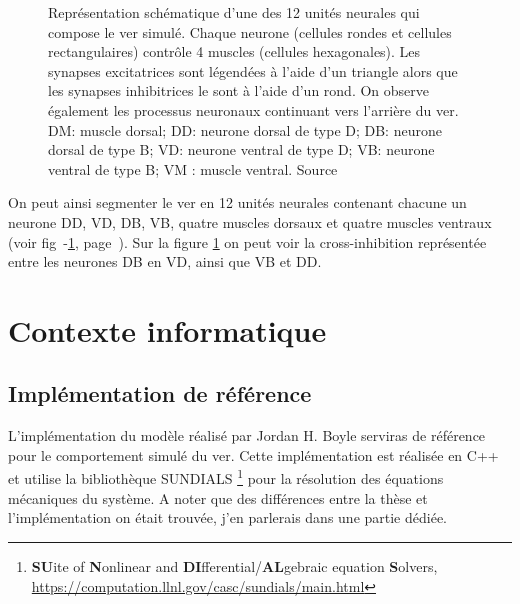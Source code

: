 \begin{figure}[ht]
   \begin{center}
   \end{center}
   \caption[Représentation d'une unité neural de \celeg{}]{Représentation
   schématique d'une des 12 unités neurales qui compose le ver simulé. Chaque
   neurone (cellules rondes et cellules rectangulaires) contrôle 4 muscles
   (cellules hexagonales).  Les synapses excitatrices sont légendées à l'aide
   d'un triangle alors que les synapses inhibitrices le sont à l'aide d'un
   rond.  On observe également les processus neuronaux continuant vers
   l'arrière du ver.  DM: muscle dorsal; DD: neurone dorsal de type D; DB:
   neurone dorsal de type B; VD: neurone ventral de type D; VB: neurone ventral
   de type B; VM : muscle ventral.  Source \cite{Boyle2009}}
   \label{fig:celegans_segment}
\end{figure}

On peut ainsi segmenter le ver en 12 unités neurales contenant chacune un neurone DD, VD,
DB, VB, quatre muscles dorsaux et quatre muscles ventraux (voir fig~-\ref{fig:celegans_segment},
page~\pageref{fig:celegans_segment}). Sur la figure \ref{fig:celegans_segment} on peut voir la
cross-inhibition représentée entre les neurones DB en VD, ainsi que VB et DD.



\section{Contexte informatique} %
\label{sec:Contexte informatique}

\subsection{Implémentation de référence} %
\label{sub:implémentation de référence}

L'implémentation du modèle réalisé par Jordan H. Boyle serviras de référence
pour le comportement simulé du ver. Cette implémentation est réalisée en C++ et
utilise la bibliothèque SUNDIALS \footnote{\textbf{SU}ite of \textbf{N}onlinear and
\textbf{DI}fferential/\textbf{AL}gebraic equation \textbf{S}olvers,
\url{https://computation.llnl.gov/casc/sundials/main.html}} pour la résolution
des équations mécaniques du système. A noter que des différences entre la thèse
et l'implémentation on était trouvée, j'en parlerais dans une partie dédiée.


